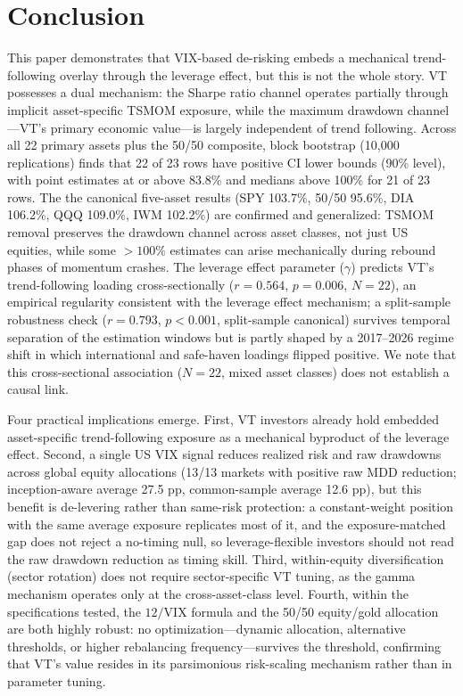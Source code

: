 \section{Conclusion}

This paper demonstrates that VIX-based de-risking embeds a mechanical trend-following overlay through the leverage effect, but this is not the whole story. VT possesses a dual mechanism: the Sharpe ratio channel operates partially through implicit asset-specific TSMOM exposure, while the maximum drawdown channel---VT's primary economic value---is largely independent of trend following. Across all 22 primary assets plus the 50/50 composite, block bootstrap (10,000 replications) finds that 22 of 23 rows have positive CI lower bounds (90\% level), with point estimates at or above 83.8\% and medians above 100\% for 21 of 23 rows. The the canonical five-asset results (SPY 103.7\%, 50/50 95.6\%, DIA 106.2\%, QQQ 109.0\%, IWM 102.2\%) are confirmed and generalized: TSMOM removal preserves the drawdown channel across asset classes, not just US equities, while some $>100\%$ estimates can arise mechanically during rebound phases of momentum crashes. The leverage effect parameter ($\gamma$) predicts VT's trend-following loading cross-sectionally ($r = 0.564$, $p = 0.006$, $N = 22$), an empirical regularity consistent with the leverage effect mechanism; a split-sample robustness check ($r = 0.793$, $p < 0.001$, split-sample canonical) survives temporal separation of the estimation windows but is partly shaped by a 2017--2026 regime shift in which international and safe-haven loadings flipped positive. We note that this cross-sectional association ($N = 22$, mixed asset classes) does not establish a causal link.

Four practical implications emerge. First, VT investors already hold embedded asset-specific trend-following exposure as a mechanical byproduct of the leverage effect. Second, a single US VIX signal reduces realized risk and raw drawdowns across global equity allocations (13/13 markets with positive raw MDD reduction; inception-aware average 27.5 pp, common-sample average 12.6 pp), but this benefit is de-levering rather than same-risk protection: a constant-weight position with the same average exposure replicates most of it, and the exposure-matched gap does not reject a no-timing null, so leverage-flexible investors should not read the raw drawdown reduction as timing skill. Third, within-equity diversification (sector rotation) does not require sector-specific VT tuning, as the gamma mechanism operates only at the cross-asset-class level. Fourth, within the specifications tested, the $12/\text{VIX}$ formula and the 50/50 equity/gold allocation are both highly robust: no optimization---dynamic allocation, alternative thresholds, or higher rebalancing frequency---survives the \citet{harvey2016} threshold, confirming that VT's value resides in its parsimonious risk-scaling mechanism rather than in parameter tuning.

